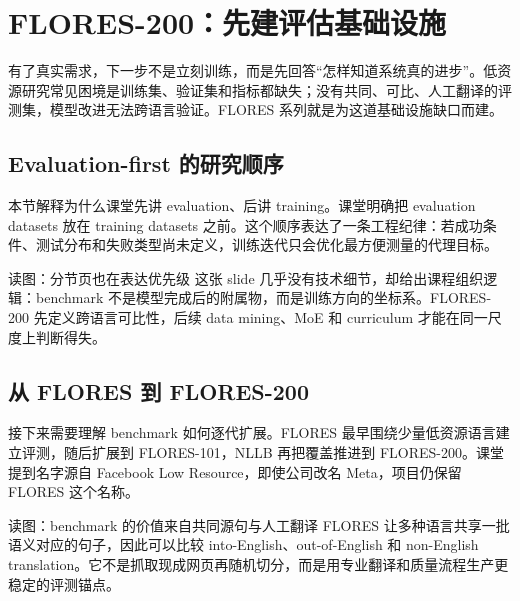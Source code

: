 \section{FLORES-200：先建评估基础设施}

有了真实需求，下一步不是立刻训练，而是先回答“怎样知道系统真的进步”。低资源研究常见困境是训练集、验证集和指标都缺失；没有共同、可比、人工翻译的评测集，模型改进无法跨语言验证。FLORES 系列就是为这道基础设施缺口而建。

\subsection{Evaluation-first 的研究顺序}

本节解释为什么课堂先讲 evaluation、后讲 training。课堂明确把 evaluation datasets 放在 training datasets 之前。这个顺序表达了一条工程纪律：若成功条件、测试分布和失败类型尚未定义，训练迭代只会优化最方便测量的代理目标。


\begin{knowledgebox}{读图：分节页也在表达优先级}
这张 slide 几乎没有技术细节，却给出课程组织逻辑：benchmark 不是模型完成后的附属物，而是训练方向的坐标系。FLORES-200 先定义跨语言可比性，后续 data mining、MoE 和 curriculum 才能在同一尺度上判断得失。
\end{knowledgebox}


\subsection{从 FLORES 到 FLORES-200}

接下来需要理解 benchmark 如何逐代扩展。FLORES 最早围绕少量低资源语言建立评测，随后扩展到 FLORES-101，NLLB 再把覆盖推进到 FLORES-200。课堂提到名字源自 Facebook Low Resource，即使公司改名 Meta，项目仍保留 FLORES 这个名称。


\begin{knowledgebox}{读图：benchmark 的价值来自共同源句与人工翻译}
FLORES 让多种语言共享一批语义对应的句子，因此可以比较 into-English、out-of-English 和 non-English translation。它不是抓取现成网页再随机切分，而是用专业翻译和质量流程生产更稳定的评测锚点。
\end{knowledgebox}

